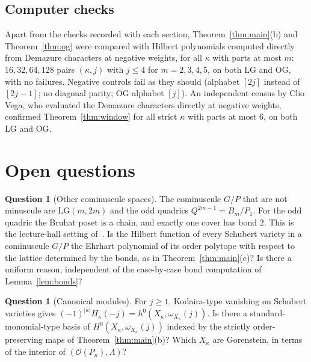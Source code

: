 \documentclass[11pt]{amsart}
\theoremstyle{definition}
\newtheorem{question}[theorem]{Question}
\theoremstyle{remark}
\newcommand{\LG}{\mathrm{LG}}
\newcommand{\OG}{\mathrm{OG}}
\newcommand{\ord}{\mathcal{O}}
\begin{document}
\subsection{Computer checks}\label{ssec:checks}
Apart from the checks recorded with each section, Theorem~\ref{thm:main}(b) and
Theorem~\ref{thm:og} were compared with Hilbert polynomials computed directly from Demazure
characters at negative weights, for all $\kappa$ with parts at most $m$: $16,32,64,128$
pairs $(\kappa,j)$ with $j\le4$ for $m=2,3,4,5$, on both $\LG$ and $\OG$, with no failures.
Negative controls fail as they should (alphabet $[2j]$ instead of $[2j-1]$; no diagonal parity;
$\OG$ alphabet $[j]$). An independent census by Clio Vega, who evaluated the Demazure characters
directly at negative weights, confirmed Theorem~\ref{thm:window} for all strict $\kappa$ with
parts at most $6$, on both $\LG$ and $\OG$.

\section{Open questions}\label{sec:open}

\begin{question}[Other cominuscule spaces]\label{q:cominuscule}
The cominuscule $G/P$ that are not minuscule are $\LG(m,2m)$ and the odd quadrics
$Q^{2m-1}=B_m/P_1$. For the odd quadric the Bruhat poset is a chain, and exactly one cover has
bond $2$. This is the lecture-hall setting of~\cite{CCFL}. Is the Hilbert function of every
Schubert variety in a cominuscule $G/P$ the Ehrhart polynomial of its order polytope with
respect to the lattice determined by the bonds, as in Theorem~\ref{thm:main}(c)? Is there a
uniform reason, independent of the case-by-case bond computation of Lemma~\ref{lem:bonds}?
\end{question}

\begin{question}[Canonical modules]
For $j\ge1$, Kodaira-type vanishing on Schubert varieties gives
$(-1)^{|\kappa|}H_\kappa(-j)=h^0(X_\kappa,\omega_{X_\kappa}(j))$. Is there a
standard-monomial-type basis of $H^0(X_\kappa,\omega_{X_\kappa}(j))$ indexed by the strictly
order-preserving maps of Theorem~\ref{thm:main}(b)? Which $X_\kappa$ are Gorenstein, in terms of
the interior of $(\ord(P_\kappa),\Lambda)$?
\end{question}
\end{document}
